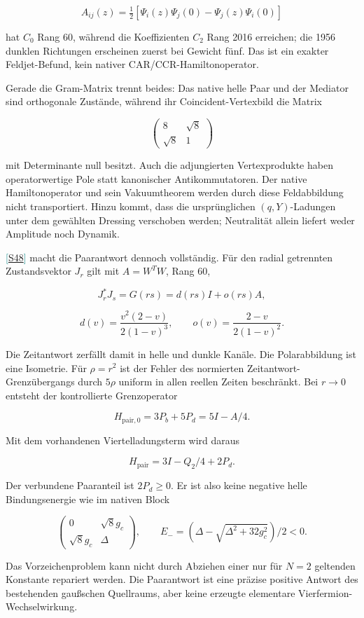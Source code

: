 \documentclass[11pt,a4paper,oneside,parskip=half,headings=normal,numbers=noenddot,bibliography=totoc]{scrreprt}
\newcommand{\src}[1]{\textcolor{teal}{\small[\hyperref[s:#1]{S#1}]}}
\begin{document}
\[
 A_{ij}(z)=\tfrac12[\Psi_i(z)\Psi_j(0)-\Psi_j(z)\Psi_i(0)]
\]

hat \(C_0\) Rang 60, während die Koeffizienten \(C_2\) Rang 2016 erreichen;
die 1956 dunklen Richtungen erscheinen zuerst bei Gewicht fünf. Das ist ein
exakter Feldjet-Befund, kein nativer CAR/CCR-Hamiltonoperator.

Gerade die Gram-Matrix trennt beides: Das native helle Paar und der Mediator
sind orthogonale Zustände, während ihr Coincident-Vertexbild die Matrix

\[
 \begin{pmatrix}8&\sqrt8\\\sqrt8&1\end{pmatrix}
\]

mit Determinante null besitzt. Auch die adjungierten Vertexprodukte haben
operatorwertige Pole statt kanonischer Antikommutatoren. Der native
Hamiltonoperator und sein Vakuumtheorem werden durch diese Feldabbildung
nicht transportiert. Hinzu kommt, dass die ursprünglichen $(q,Y)$-Ladungen
unter dem gewählten Dressing verschoben werden; Neutralität allein liefert
weder Amplitude noch Dynamik.

\src{48} macht die Paarantwort dennoch vollständig.
Für den radial getrennten Zustandsvektor \(J_r\) gilt mit \(A=W^TW\), Rang 60,

\[
 J_r^*J_s=G(rs)=d(rs)I+o(rs)A,
\]

\[
 d(v)=\frac{v^2(2-v)}{2(1-v)^3},\qquad
 o(v)=\frac{2-v}{2(1-v)^2}.
\]

Die Zeitantwort zerfällt damit in helle und dunkle Kanäle. Die Polarabbildung ist eine Isometrie. Für $\rho=r^2$ ist der Fehler des normierten Zeitantwort-Grenzübergangs durch $5\rho$ uniform in allen reellen Zeiten beschränkt. Bei \(r\to0\) entsteht der kontrollierte Grenzoperator

\[
 H_\mathrm{pair,0}=3P_b+5P_d=5I-A/4.
\]

Mit dem vorhandenen Viertelladungsterm wird daraus

\[
 H_\mathrm{pair}=3I-Q_2/4+2P_d.
\]

Der verbundene Paaranteil ist \(2P_d\ge0\). Er ist also keine negative helle
Bindungsenergie wie im nativen Block

\[
 \begin{pmatrix}0&\sqrt8g_c\\\sqrt8g_c&\Delta\end{pmatrix},\qquad
 E_-=(\Delta-\sqrt{\Delta^2+32g_c^2})/2<0.
\]

Das Vorzeichenproblem kann nicht durch Abziehen einer nur für $N=2$
geltenden Konstante repariert werden. Die Paarantwort ist eine präzise
positive Antwort des bestehenden gaußschen Quellraums, aber keine erzeugte
elementare Vierfermion-Wechselwirkung.
\end{document}
